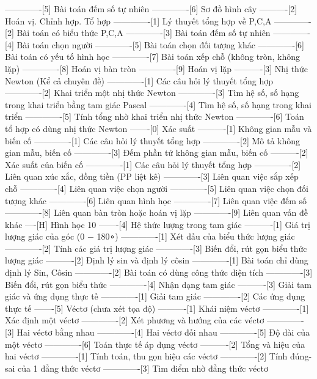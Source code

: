 -------------[5] Bài toán đếm số tự nhiên
-------------[6] Sơ đồ hình cây
----------[2] Hoán vị. Chỉnh hợp. Tổ hợp
-------------[1] Lý thuyết tổng hợp về P,C,A
-------------[2] Bài toán có biểu thức P,C,A
-------------[3] Bài toán đếm số tự nhiên
-------------[4] Bài toán chọn người
-------------[5] Bài toán chọn đối tượng khác
-------------[6] Bài toán có yếu tố hình học
-------------[7] Bài toán xếp chỗ (không tròn, không lặp)
-------------[8] Hoán vị bàn tròn
-------------[9] Hoán vị lặp
----------[3] Nhị thức Newton (Kể cả chuyên đề)
-------------[1] Các câu hỏi lý thuyết tổng hợp
-------------[2] Khai triển một nhị thức Newton
-------------[3] Tìm hệ số, số hạng trong khai triển bằng tam giác Pascal
-------------[4] Tìm hệ số, số hạng trong khai triển
-------------[5] Tính tổng nhờ khai triển nhị thức Newton
-------------[6] Toán tổ hợp có dùng nhị thức Newton
-------[0] Xác suất
----------[1] Không gian mẫu và biến cố
-------------[1] Các câu hỏi lý thuyết tổng hợp
-------------[2] Mô tả không gian mẫu, biến cố
-------------[3] Đếm phần tử không gian mẫu, biến cố
----------[2] Xác suất của biến cố
-------------[1] Các câu hỏi lý thuyết tổng hợp
-------------[2] Liên quan xúc xắc, đồng tiền (PP liệt kê)
-------------[3] Liên quan việc sắp xếp chỗ
-------------[4] Liên quan việc chọn người
-------------[5] Liên quan việc chọn đối tượng khác
-------------[6] Liên quan hình học
-------------[7] Liên quan việc đếm số
-------------[8] Liên quan bàn tròn hoặc hoán vị lặp 
-------------[9] Liên quan vấn đề khác
----[H] Hình học 10
-------[4] Hệ thức lượng trong tam giác
----------[1] Giá trị lượng giác của góc (0 − 180∘)
-------------[1] Xét dấu của biểu thức lượng giác
-------------[2] Tính các giá trị lượng giác
-------------[3] Biến đổi, rút gọn biểu thức lượng giác
----------[2] Định lý sin và định lý côsin
-------------[1] Bài toán chỉ dùng định lý Sin, Côsin
-------------[2] Bài toán có dùng công thức diện tích
-------------[3] Biến đổi, rút gọn biểu thức
-------------[4] Nhận dạng tam giác
----------[3] Giải tam giác và ứng dụng thực tế
-------------[1] Giải tam giác
-------------[2] Các ứng dụng thực tế
-------[5] Véctơ (chưa xét tọa độ)
----------[1] Khái niệm véctơ
-------------[1] Xác định một véctơ
-------------[2] Xét phương và hướng của các véctơ
-------------[3] Hai véctơ bằng nhau
-------------[4] Hai véctơ đối nhau
-------------[5] Độ dài của một véctơ
-------------[6] Toán thực tế áp dụng véctơ
----------[2] Tổng và hiệu của hai véctơ
-------------[1] Tính toán, thu gọn hiệu các véctơ
-------------[2] Tính đúng-sai của 1 đẳng thức véctơ
-------------[3] Tìm điểm nhờ đẳng thức véctơ

